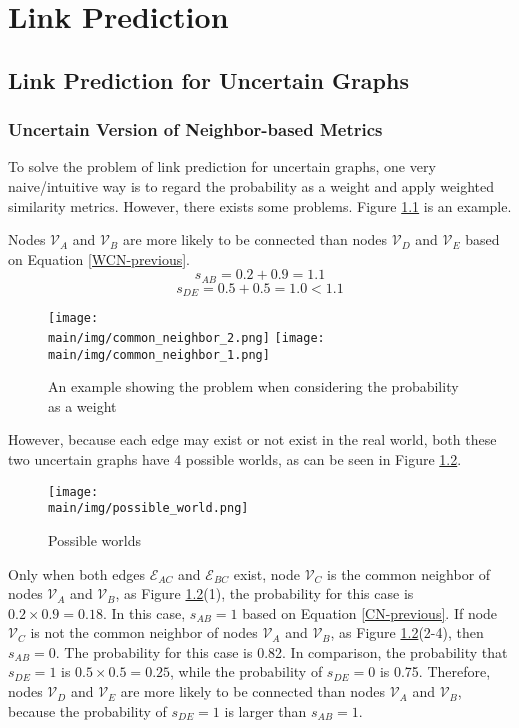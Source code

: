 \documentclass[\main/thesis.tex]{subfiles}
\begin{document}
\chapter{Link Prediction}
\section{Link Prediction for Uncertain Graphs}
\subsection{Uncertain Version of Neighbor-based Metrics} \label{Uncertain-Version-of-Neighbor-based-Metrics}
To solve the problem of link prediction for uncertain graphs, one very naive/intuitive way is to regard the probability as a weight and apply weighted similarity metrics. However, there exists some problems. Figure \ref{problem-consider-probability-as-weight-link} is an example.

Nodes $\mathcal{V}_A$ and $\mathcal{V}_B$ are more likely to be connected than nodes $\mathcal{V}_D$ and $\mathcal{V}_E$ based on Equation \ref{WCN-previous}.
\begin{equation}
s_{AB} = 0.2 + 0.9 = 1.1
\end{equation}
\begin{equation}
s_{DE} = 0.5 + 0.5 = 1.0 < 1.1
\end{equation}

\begin{figure}
\texttt{[image: \\main/img/common\_neighbor\_2.png]}
\texttt{[image: \\main/img/common\_neighbor\_1.png]}
\centering
\caption{An example showing the problem when considering the probability as a weight}
\label{problem-consider-probability-as-weight-link}
\end{figure}

However, because each edge may exist or not exist in the real world, both these two uncertain graphs have 4 possible worlds, as can be seen in Figure \ref{possible-world-link}.

\begin{figure}
\texttt{[image: \\main/img/possible\_world.png]}
\centering
\caption{Possible worlds}
\label{possible-world-link}
\end{figure}

Only when both edges $\mathcal{E}_{AC}$ and $\mathcal{E}_{BC}$ exist, node $\mathcal{V}_C$ is the common neighbor of nodes $\mathcal{V}_A$ and $\mathcal{V}_B$, as Figure \ref{possible-world-link}(1), the probability for this case is $0.2\times 0.9=0.18$. In this case, $s_{AB}=1$ based on Equation \ref{CN-previous}. If node $\mathcal{V}_C$ is not the common neighbor of nodes $\mathcal{V}_A$ and $\mathcal{V}_B$, as Figure \ref{possible-world-link}(2-4),  then $s_{AB}=0$. The probability for this case is 0.82. In comparison, the probability that $s_{DE}=1$ is $0.5\times 0.5=0.25$, while the probability of $s_{DE}=0$ is 0.75. Therefore, nodes $\mathcal{V}_D$ and $\mathcal{V}_E$ are more likely to be connected than nodes $\mathcal{V}_A$ and $\mathcal{V}_B$, because the probability of $s_{DE}=1$ is larger than $s_{AB}=1$. 
\end{document}

